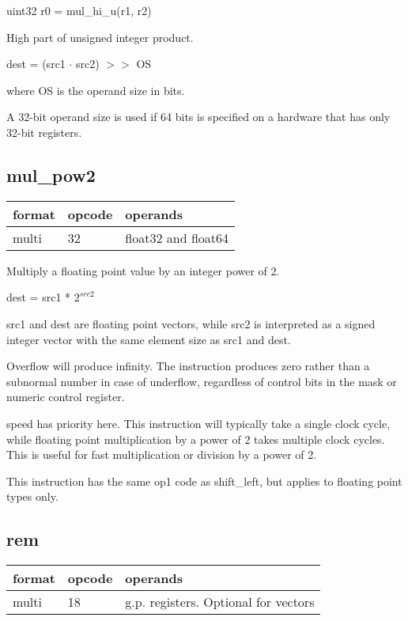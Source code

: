 \documentclass[forwardcom.tex]{subfiles}
\begin{document}
uint32 r0 = mul\_hi\_u(r1, r2)
\vv

High part of unsigned integer product.
\vv

dest = (src1 $\cdot$ src2) $>>$ OS

where OS is the operand size in bits.
\vv

A 32-bit operand size is used if 64 bits is specified on a hardware that has only 32-bit registers.
\vv


\subsection{mul\_pow2}
\label{table:mulPow2Instruction}
\begin{tabular}{|p{12mm}|p{15mm}|p{100mm}|}
\hline
\bfseries format & \bfseries opcode & \bfseries operands \\ \hline
multi & 32 & float32 and float64 \\ \hline
\end{tabular}
\vv

Multiply a floating point value by an integer power of 2.

dest = src1 * $2^{src2}$

src1 and dest are floating point vectors, while src2 is interpreted as a signed integer vector with the same element size as src1 and dest.
\vv

Overflow will produce infinity. 
The instruction produces zero rather than a subnormal number in case of underflow, regardless of control bits in the mask or numeric control register.
\vv

speed has priority here. This instruction will typically take a single clock cycle, while floating point multiplication by a power of 2 takes multiple clock cycles. 
This is useful for fast multiplication or division by a power of 2.
\vv

This instruction has the same op1 code as shift\_left, but applies to floating point types only.
\vv


\subsection{rem}
\label{table:remInstruction}
\begin{tabular}{|p{12mm}|p{15mm}|p{100mm}|}
\hline
\bfseries format & \bfseries opcode & \bfseries operands \\ \hline
multi & 18 & g.p. registers. Optional for vectors \\ \hline
\end{tabular}
\vv
\end{document}
